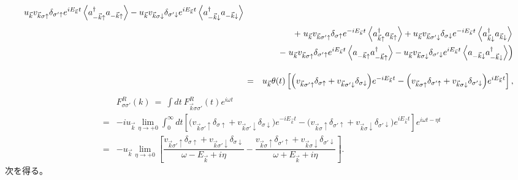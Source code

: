 \documentclass[uplatex,a4j,12pt,dvipdfmx]{jsarticle}
\begin{document}
\begin{eqnarray}
	\left.
	u_{\vec{k}}
	v_{\vec{k} \sigma \uparrow}
	\delta_{\sigma' \uparrow}
	e^{ i E_{\vec{k}} t }
	\left\langle
	a_{-\vec{k} \uparrow}^{\dagger}
	a_{-\vec{k} \uparrow}
	\right\rangle
	-
	u_{\vec{k}}
	v_{\vec{k} \sigma \downarrow}
	\delta_{\sigma' \downarrow}
	e^{ i E_{\vec{k}} t }
	\left\langle
	a_{-\vec{k} \downarrow}^{\dagger}
	a_{-\vec{k} \downarrow}
	\right\rangle
	\right.
	\nonumber \\[1mm] && \hspace{5mm} +
	\left.
	u_{\vec{k}}
	v_{\vec{k} \sigma' \uparrow}
	\delta_{\sigma \uparrow}
	e^{ - i E_{\vec{k}} t }
	\left\langle
	a_{\vec{k} \uparrow}^{\dagger}
	a_{\vec{k} \uparrow}
	\right\rangle
	+
	u_{\vec{k}}
	v_{\vec{k} \sigma' \downarrow}
	\delta_{\sigma \downarrow}
	e^{ - i E_{\vec{k}} t }
	\left\langle
	a_{\vec{k} \downarrow}^{\dagger}
	a_{\vec{k} \downarrow}
	\right\rangle
	\right.
	\nonumber \\ && \hspace{4mm} -
	\left.
	u_{ \vec{k} }
	v_{\vec{k} \sigma \uparrow}
	\delta_{\sigma' \uparrow}
	e^{ i E_{\vec{k}} t }
	\left\langle
	a_{-\vec{k} \uparrow}
	a_{-\vec{k} \uparrow}^{\dagger}
	\right\rangle
	-
	u_{\vec{k}}
	v_{\vec{k} \sigma \downarrow}
	\delta_{\sigma' \downarrow}
	e^{ i E_{\vec{k}} t }
	\left\langle
	a_{-\vec{k} \downarrow}
	a_{-\vec{k} \downarrow}^{\dagger}
	\right\rangle
	\right)
	\nonumber \\[4mm]
	&=&
	u_{\vec{k}}
	\theta(t)
	\left[
		\Big(
		v_{\vec{k} \sigma' \uparrow}
		\delta_{\sigma \uparrow}
		+
		v_{\vec{k} \sigma' \downarrow}
		\delta_{\sigma \downarrow}
		\Big)
		e^{ - i E_{\vec{k}} t }
		-
		\Big(
		v_{\vec{k} \sigma \uparrow}
		\delta_{\sigma' \uparrow}
		+
		v_{\vec{k} \sigma \downarrow}
		\delta_{\sigma' \downarrow}
		\Big)
		e^{ i E_{\vec{k}} t }
		\right]
	,
\end{eqnarray}
\begin{eqnarray}
	&&
	F_{\sigma \sigma'}^{R}(k)
	\ = \
	\int \! dt \ F_{\vec{k} \sigma \sigma'}^{R}(t) e^{i \omega t}
	\nonumber \\[4mm] &=&
	-
	i
	u_{\vec{k}}
	\lim_{\eta \to +0}
	\int^{\infty}_{0} \!\! dt
	\left[
		\Big(
		v_{\vec{k} \sigma' \uparrow}
		\delta_{\sigma \uparrow}
		+
		v_{\vec{k} \sigma' \downarrow}
		\delta_{\sigma \downarrow}
		\Big)
		e^{ - i E_{\vec{k}} t }
		-
		\Big(
		v_{\vec{k} \sigma \uparrow}
		\delta_{\sigma' \uparrow}
		+
		v_{\vec{k} \sigma \downarrow}
		\delta_{\sigma' \downarrow}
		\Big)
		e^{ i E_{\vec{k}} t }
		\right]
	e^{i \omega t - \eta t}
	\nonumber \\[4mm] &=&
	-
	u_{\vec{k}}
	\lim_{\eta \to +0}
	\left[
		\dfrac{
			v_{\vec{k} \sigma' \uparrow}
			\delta_{\sigma \uparrow}
			+
			v_{\vec{k} \sigma' \downarrow}
			\delta_{\sigma \downarrow}
		}{ \omega - E_{\vec{k}} + i \eta }
		-
		\dfrac{
			v_{\vec{k} \sigma \uparrow}
			\delta_{\sigma' \uparrow}
			+
			v_{\vec{k} \sigma \downarrow}
			\delta_{\sigma' \downarrow}
		}{ \omega + E_{\vec{k}} + i \eta }
		\right]
	.
\end{eqnarray}
%
次を得る。
\end{document}
